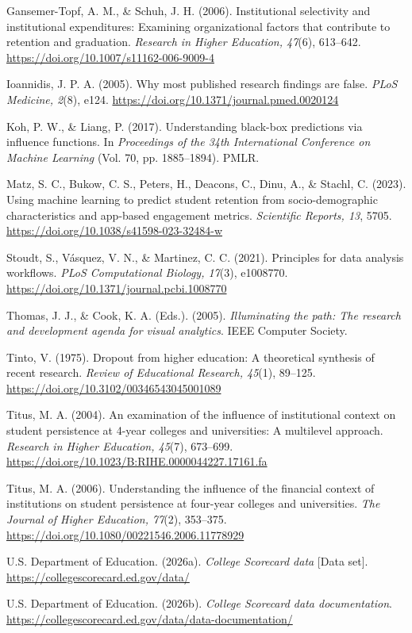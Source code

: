 \documentclass[12pt,a4paper]{article}
\begin{document}
Gansemer-Topf, A. M., \& Schuh, J. H. (2006). Institutional selectivity and institutional expenditures: Examining organizational factors that contribute to retention and graduation. \textit{Research in Higher Education, 47}(6), 613--642. \url{https://doi.org/10.1007/s11162-006-9009-4}

Ioannidis, J. P. A. (2005). Why most published research findings are false. \textit{PLoS Medicine, 2}(8), e124. \url{https://doi.org/10.1371/journal.pmed.0020124}

Koh, P. W., \& Liang, P. (2017). Understanding black-box predictions via influence functions. In \textit{Proceedings of the 34th International Conference on Machine Learning} (Vol. 70, pp. 1885--1894). PMLR.

Matz, S. C., Bukow, C. S., Peters, H., Deacons, C., Dinu, A., \& Stachl, C. (2023). Using machine learning to predict student retention from socio-demographic characteristics and app-based engagement metrics. \textit{Scientific Reports, 13}, 5705. \url{https://doi.org/10.1038/s41598-023-32484-w}

Stoudt, S., V\'asquez, V. N., \& Martinez, C. C. (2021). Principles for data analysis workflows. \textit{PLoS Computational Biology, 17}(3), e1008770. \url{https://doi.org/10.1371/journal.pcbi.1008770}

Thomas, J. J., \& Cook, K. A. (Eds.). (2005). \textit{Illuminating the path: The research and development agenda for visual analytics}. IEEE Computer Society.

Tinto, V. (1975). Dropout from higher education: A theoretical synthesis of recent research. \textit{Review of Educational Research, 45}(1), 89--125. \url{https://doi.org/10.3102/00346543045001089}

Titus, M. A. (2004). An examination of the influence of institutional context on student persistence at 4-year colleges and universities: A multilevel approach. \textit{Research in Higher Education, 45}(7), 673--699. \url{https://doi.org/10.1023/B:RIHE.0000044227.17161.fa}

Titus, M. A. (2006). Understanding the influence of the financial context of institutions on student persistence at four-year colleges and universities. \textit{The Journal of Higher Education, 77}(2), 353--375. \url{https://doi.org/10.1080/00221546.2006.11778929}

U.S. Department of Education. (2026a). \textit{College Scorecard data} [Data set]. \url{https://collegescorecard.ed.gov/data/}

U.S. Department of Education. (2026b). \textit{College Scorecard data documentation}. \url{https://collegescorecard.ed.gov/data/data-documentation/}
\end{document}
